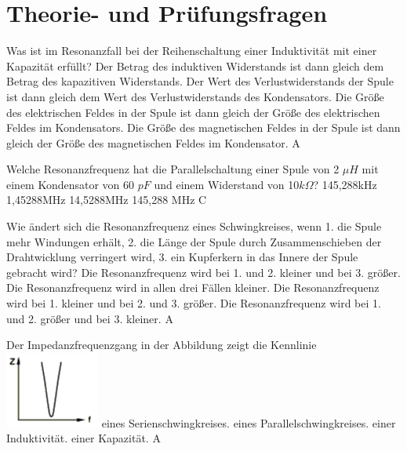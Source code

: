 
\section*{Theorie- und Prüfungsfragen} 

{Was ist im Resonanzfall bei der Reihenschaltung einer Induktivität mit einer Kapazität erfüllt?}%
{Der Betrag des induktiven Widerstands ist dann gleich dem Betrag des kapazitiven Widerstands.}%
{Der Wert des Verlustwiderstands der Spule ist dann gleich dem Wert des Verlustwiderstands des Kondensators.}%
{Die Größe des elektrischen Feldes in der Spule ist dann gleich der Größe des elektrischen Feldes im Kondensators.}%
{Die Größe des magnetischen Feldes in der Spule ist dann gleich der Größe des magnetischen Feldes im Kondensator.}%
{A}%

{Welche Resonanzfrequenz hat die Parallelschaltung einer Spule von 2 $\mu H$ mit einem Kondensator von 60 $pF$ und einem Widerstand von 10$k\Omega$?}%
{145,288kHz}%
{1,45288MHz}%
{14,5288MHz}%
{145,288 MHz}%
{C}%

{ Wie ändert sich die Resonanzfrequenz eines Schwingkreises, wenn
1. die Spule mehr Windungen erhält, 2. die Länge der Spule durch Zusammenschieben der Drahtwicklung verringert wird, 3. ein Kupferkern in das Innere der Spule gebracht wird?}%
{Die Resonanzfrequenz wird bei 1. und 2. kleiner und bei 3. größer.}%
{Die Resonanzfrequenz wird in allen drei Fällen kleiner.}%
{Die Resonanzfrequenz wird bei 1. kleiner und bei 2. und 3. größer.}%
{Die Resonanzfrequenz wird bei 1. und 2. größer und bei 3. kleiner.}%
{A}%


{Der Impedanzfrequenzgang in der Abbildung zeigt die Kennlinie\\ \includegraphics[scale=0.5]{Schwingkreis/Bilder/TD201.png}}%
{eines Serienschwingkreises.}%
{eines Parallelschwingkreises.}%
{einer Induktivität.}%
{einer Kapazität.}%
{A}%

